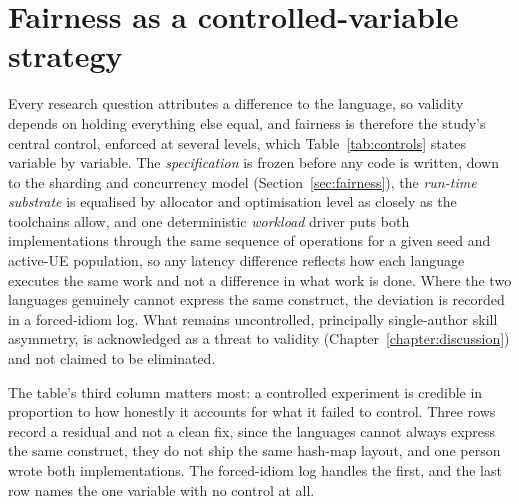 \section{Fairness as a controlled-variable strategy}\label{sec:controls}
Every research question attributes a difference to the language, so validity depends on holding
everything else equal, and fairness is therefore the study's central control, enforced at
several levels, which Table~\ref{tab:controls} states variable by variable. The
\emph{specification} is frozen before any code is written, down to the sharding and concurrency
model (Section~\ref{sec:fairness}), the \emph{run-time substrate} is equalised by allocator and
optimisation level as closely as the toolchains allow, and one deterministic \emph{workload}
driver puts both implementations through the same sequence of operations for a given seed and
active-UE population, so any latency difference reflects how each language executes the same
work and not a difference in what work is done. Where the two languages genuinely cannot express
the same construct, the deviation is recorded in a forced-idiom log. What remains uncontrolled,
principally single-author skill asymmetry, is acknowledged as a threat to validity
(Chapter~\ref{chapter:discussion}) and not claimed to be eliminated.

The table's third column matters most: a controlled experiment is credible in proportion to how
honestly it accounts for what it failed to control. Three rows record a residual and not a clean fix, since the languages cannot
always express the same construct, they do not ship the same hash-map layout, and one person
wrote both implementations. The forced-idiom log handles the first, and the last row names the
one variable with no control at all.

